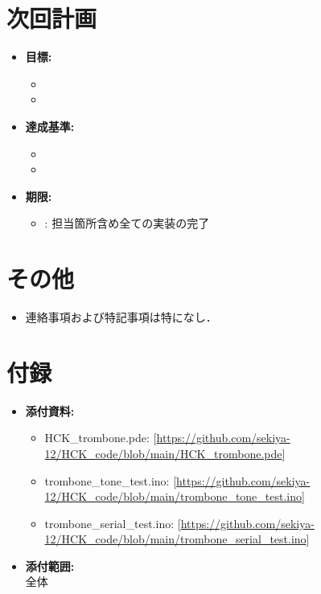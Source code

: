 \documentclass[10pt]{ltjsarticle} %
\begin{document}
\vspace{5mm}

\section{次回計画}
\begin{itemize}
    \item \textbf{目標:}
    \begin{itemize}
        \item[$\circ$] [残りの単体テスト．]
        \item[$\circ$] [残りの結合テスト．]
    \end{itemize}
    \item \textbf{達成基準:}
    \begin{itemize}
        \item[$\circ$] [残りの単体テストが全て完了していること．]
        \item[$\circ$] [残りの結合テストが全て完了していること．]
    \end{itemize}
    \item \textbf{期限:}
    \begin{itemize}
        \item[$\circ$] [7/08]: 担当箇所含め全ての実装の完了
    \end{itemize}
\end{itemize}

\vspace{5mm}

\section{その他}
\begin{itemize}
    \item 連絡事項および特記事項は特になし．
\end{itemize}

\vspace{5mm}

\section{付録}
\begin{itemize}
    \item \textbf{添付資料:}
    \begin{itemize}
        \item[$\circ$] HCK\_trombone.pde: [\url{https://github.com/sekiya-12/HCK_code/blob/main/HCK_trombone.pde}]
        \item[$\circ$] trombone\_tone\_test.ino: [\url{https://github.com/sekiya-12/HCK_code/blob/main/trombone_tone_test.ino}]
        \item[$\circ$] trombone\_serial\_test.ino: [\url{https://github.com/sekiya-12/HCK_code/blob/main/trombone_serial_test.ino}]
    \end{itemize}
    \item \textbf{添付範囲:} \\
    \indent 全体
\end{itemize}
\end{document}

